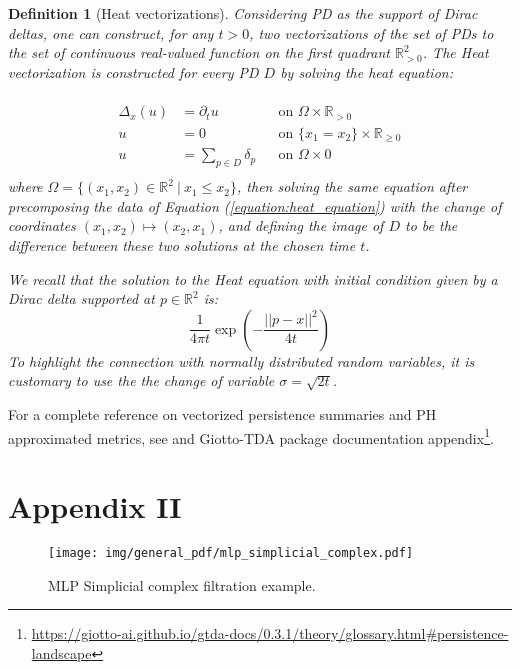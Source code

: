 \documentclass{article}
\newtheorem{definition}{Definition}
\begin{document}
\begin{definition}[Heat vectorizations]
Considering PD as the support of Dirac deltas, one can construct, for any $t > 0$, two vectorizations of the set of PDs to the set of continuous real-valued function on the first quadrant $\mathbb{R}^2_{>0}$. The Heat vectorization is constructed for every PD $D$ by solving the heat equation:

\begin{eqnarray}
 \label{equation:heat_equation}
    \begin{split}\begin{aligned}
    \Delta_x(u) &= \partial_t u && \text{on } \Omega \times \mathbb R_{>0} \\
    u &= 0 && \text{on } \{x_1 = x_2\} \times \mathbb R_{\geq 0} \\
    u &= \sum_{p \in D} \delta_p && \text{on } \Omega \times {0} \end{aligned}\end{split}
\end{eqnarray}
where $\Omega = \{(x_1, x_2) \in \mathbb R^2\ |\ x_1 \leq x_2\}$, then solving the same equation after precomposing the data of Equation (\ref{equation:heat_equation}) with the change of coordinates $(x_1, x_2) \mapsto (x_2, x_1)$, and defining the image of $D$ to be the difference between these two solutions at the chosen time $t$.

We recall that the solution to the Heat equation with initial condition given by a Dirac delta supported at $p \in \mathbb R^2$ is:
\begin{equation}
    \frac{1}{4 \pi t} \exp\left(-\frac{||p-x||^2}{4t}\right)
\end{equation}
To highlight the connection with normally distributed random variables, it is customary to use the the change of variable $\sigma = \sqrt{2t}$.
\end{definition}


For a complete reference on vectorized persistence summaries and PH approximated metrics, see \citet{tauzin2020giottotda, Berry2020FunctionalSO} and Giotto-TDA package documentation appendix\footnote{\url{https://giotto-ai.github.io/gtda-docs/0.3.1/theory/glossary.html\#persistence-landscape}}.

\section*{Appendix II}

\begin{figure}[H]
\centering
    \texttt{[image: img/general\_pdf/mlp\_simplicial\_complex.pdf]}
    \caption{MLP Simplicial complex filtration example.} 
    \label{fig:mlp_simplicial_complex}
\end{figure}
\end{document}
